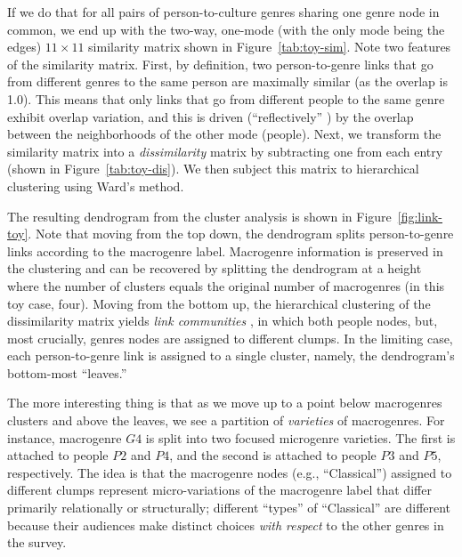 \documentclass[a4paper,12pt]{extarticle}
\begin{document}
If we do that for all pairs of person-to-culture genres sharing one genre node in common, we end up with the two-way, one-mode (with the only mode being the edges) $11 \times 11$ similarity matrix shown in Figure~\ref{tab:toy-sim}. Note two features of the similarity matrix. First, by definition, two person-to-genre links that go from different genres to the same person are maximally similar (as the overlap is 1.0). This means that only links that go from different people to the same genre exhibit overlap variation, and this is driven (``reflectively'' \citep{lizardo18}) by the overlap between the neighborhoods of the other mode (people). Next, we transform the similarity matrix into a {\em dissimilarity} matrix by subtracting one from each entry (shown in  Figure~\ref{tab:toy-dis}). We then subject this matrix to hierarchical clustering using Ward's \citeyearpar{ward63} method. 

The resulting dendrogram from the cluster analysis is shown in Figure~\ref{fig:link-toy}. Note that moving from the top down, the dendrogram splits person-to-genre links according to the macrogenre label. Macrogenre information is preserved in the clustering and can be recovered by splitting the dendrogram at a height where the number of clusters equals the original number of macrogenres (in this toy case, four). Moving from the bottom up, the hierarchical clustering of the dissimilarity matrix yields {\em link communities} \citep{ahn_etal10}, in which both people nodes, but, most crucially, genres nodes are assigned to different clumps. In the limiting case, each person-to-genre link is assigned to a single cluster, namely, the dendrogram's bottom-most ``leaves.'' 

The more interesting thing is that as we move up to a point below macrogenres clusters and above the leaves, we see a partition of {\em varieties} of macrogenres. For instance, macrogenre $G4$ is split into two focused microgenre varieties. The first is attached to people $P2$ and $P4$, and the second is attached to people $P3$ and $P5$, respectively. The idea is that the macrogenre nodes (e.g., ``Classical'') assigned to different clumps represent micro-variations of the macrogenre label that differ primarily relationally or structurally; different ``types'' of ``Classical'' are different because their audiences make distinct choices {\em with respect} to the other genres in the survey. 
\end{document}

